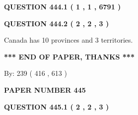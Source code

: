 \documentclass[12pt]{article}
\begin{document}
   
 \vspace{0.2in}
 
 
 
 
   
   
  
\vspace{0.2in}
  
{\textbf{\Large{QUESTION
444.1 
 ( 1 , 1 , 6791 )
}}}
  
  
  
\vspace{0.2in}
  
{\textbf{\Large{QUESTION
444.2 
 ( 2 , 2 , 3 )
}}}
  
  
 
 
\noindent{}
 
 
Canada has 10  provinces and 3 territories.
 
 
 
 
   
   
 \vspace{0.2in}
 
   
   
   
   
\vspace{1.0in} 
{\textbf{\large{ *** END OF PAPER, THANKS *** }}} 
   
   
\hspace{1.0in} By: 
 239 ( 416 ,  613 )
   
   
   
   
\newpage 
\setcounter{page}{ 
   445001 } 
   
   
   
   
 {\textbf{ \Large{ PAPER NUMBER  445  }}}
   
   
\vspace{0.2in}
   
   
   
   
   
   
 \vspace{0.2in}
 
 
 
 
   
   
  
\vspace{0.2in}
  
{\textbf{\Large{QUESTION
445.1 
 ( 2 , 2 , 3 )
}}}
  
  
 
\end{document}
